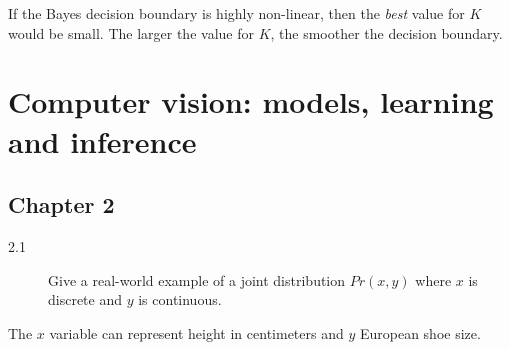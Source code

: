 \documentclass[10pt,a4paper]{article}
\newenvironment{prob}[1]%
   {%
    \begin{description}\item[#1]}%
   {\end{description}}
\begin{document}
If the Bayes decision boundary is highly non-linear, then the
\textit{best} value for $K$ would be small. The larger the value for
$K$, the smoother the decision boundary.

\section{Computer vision: models, learning and inference}

\subsection{Chapter 2}

\begin{prob}{2.1}
  Give a real-world example of a joint distribution $Pr(x, y)$ where
  $x$ is discrete and $y$ is continuous.
\end{prob}
The $x$ variable can represent height in centimeters and $y$ European shoe size.
\end{document}
